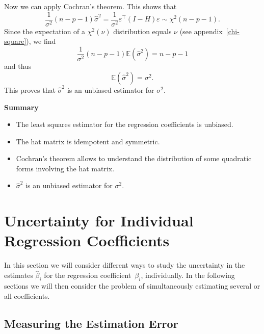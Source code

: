 \documentclass[
  a4paper,
]{article}
\providecommand{\tightlist}{%
  \setlength{\itemsep}{0pt}\setlength{\parskip}{0pt}}
\theoremstyle{definition}
\theoremstyle{definition}
\theoremstyle{definition}
\theoremstyle{definition}
\theoremstyle{remark}
\begin{document}
Now we can apply Cochran's theorem. This shows that
\begin{equation}
  \frac{1}{\sigma^2} (n - p - 1) \hat\sigma^2
  = \frac{1}{\sigma^2} \varepsilon^\top (I-H) \varepsilon
  \sim \chi^2(n - p - 1).  \label{eq:sigma-hat-chi-squared}
\end{equation}
Since the expectation of a \(\chi^2(\nu)\) distribution equals \(\nu\)
(see appendix~\ref{chi-square}), we find
\begin{equation*}
  \frac{1}{\sigma^2} (n - p - 1) \mathbb{E}(\hat\sigma^2)
  = n - p - 1
\end{equation*}
and thus
\begin{equation*}
  \mathbb{E}(\hat\sigma^2)
  = \sigma^2.
\end{equation*}
This proves that \(\hat\sigma^2\) is an unbiased estimator for \(\sigma^2\).

\textbf{Summary}

\begin{itemize}
\tightlist
\item
  The least squares estimator for the regression coefficients is unbiased.
\item
  The hat matrix is idempotent and symmetric.
\item
  Cochran's theorem allows to understand the distribution of some
  quadratic forms involving the hat matrix.
\item
  \(\hat\sigma^2\) is an unbiased estimator for \(\sigma^2\).
\end{itemize}

\clearpage

\hypertarget{S05-single}{%
\section{Uncertainty for Individual Regression Coefficients}\label{S05-single}}

In this section we will consider different ways to study the uncertainty in the
estimates \(\hat\beta_i\) for the regression coefficient~\(\beta_i\),
individually. In the following sections we will then consider the problem of
simultaneously estimating several or all coefficients.

\hypertarget{measuring-the-estimation-error}{%
\subsection{Measuring the Estimation Error}\label{measuring-the-estimation-error}}
\end{document}
